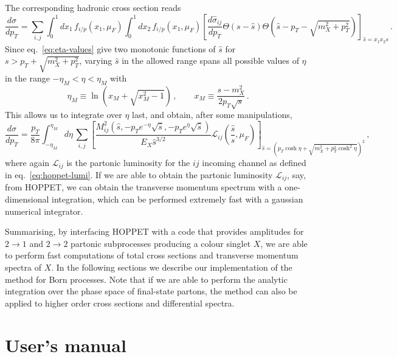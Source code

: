 \documentclass[12pt,a4wide]{article}
\begin{document}
The corresponding hadronic cross section reads
\begin{equation}
\label{eq:hadronic-pt}
  \frac{d\sigma}{dp_T} = \sum_{i,j} \int_0^1 dx_1\, f_{i/p}(x_1,\mu_F)\int_0^1 dx_2 \, f_{i/p}(x_1,\mu_F) \left[\frac{d\hat \sigma_{ij}}{dp_T} \Theta(s-\hat s) \Theta\left(\hat s-p_T-\sqrt{m_X^2+p^2_T}\right)  \right]_{\hat s=x_1x_2 s}\,.
\end{equation}
Since eq.~\eqref{eq:eta-values} give two monotonic functions of $\hat s$ for $s>p_T+\sqrt{m_X^2+p^2_T}$, varying $\hat s$ in the allowed range spans all possible values of $\eta$ in the range $-\eta_M<\eta<\eta_M$ with
\begin{equation}
\label{eq:eta-range}
\eta_M \equiv \ln(x_M + \sqrt{x_M^2-1})\,,\qquad  x_M\equiv\frac{s-m_X^2}{2 p_T \sqrt{s} }\,.
\end{equation}
This allows us to integrate over $\eta$ last, and obtain, after some
manipulations,
\begin{equation}
\label{eq:hadronic-pt-lumi}
  \frac{d\sigma}{dp_T} = \frac{p_T}{8 \pi}\int_{-\eta_M}^{\eta_M}\!d\eta\, \sum_{i,j}  \left[\frac{M^2_{ij}\left(\hat s,-p_T e^{-\eta}\sqrt {\hat s}  ,- p_T e^{\eta}\sqrt{\hat s}\right)}{E_X \hat s^{3/2}}\mathcal{L}_{ij}\left(\frac{\hat s}{s},\mu_F\right) \right]_{\hat s=\left(p_T\cosh\eta+\sqrt{m_X^2+p^2_T\cosh^2\eta}\right)^2}\,,
\end{equation}
where again $\mathcal{L}_{ij}$ is the partonic luminosity for the $ij$
incoming channel as defined in eq.~\eqref{eq:hoppet-lumi}. If we are
able to obtain the partonic luminosity $\mathcal{L}_{ij}$, say, from
HOPPET, we can obtain the transverse momentum spectrum with a
one-dimensional integration, which can be performed extremely fast
with a gaussian numerical integrator.

Summarising, by interfacing HOPPET with a code that provides
amplitudes for $2\to 1$ and $2\to 2$ partonic subprocesses producing a
colour singlet $X$, we are able to perform fast computations of total
cross sections and transverse momentum spectra of $X$. In the
following sections we describe our implementation of the method for
Born processes. Note that if we are able to perform the analytic
integration over the phase space of final-state partons, the method
can also be applied to higher order cross sections and differential
spectra.

%

\section{User's manual} \label{sec:manual} 
\end{document}
